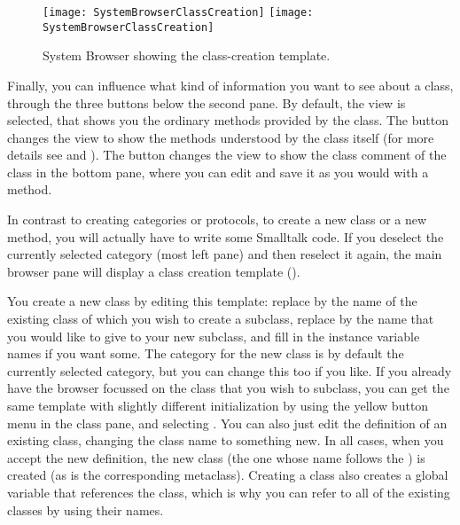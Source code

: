 \documentclass[a4paper,10pt,twoside]{book}
\begin{document}
\begin{figure}[htbp]
   \centering
   \ifluluelse
	   {\texttt{[image: SystemBrowserClassCreation]}}
	   {\texttt{[image: SystemBrowserClassCreation]}}
   \caption{System Browser showing the class-creation template.
   \label{fig:SystemBrowserClassCreation}}
\end{figure}

Finally, you can influence what kind of information you want to see about a class, through the three buttons below the second pane.
By default, the  view is selected, that shows you the ordinary methods provided by the class.
The  button changes the view to show the methods understood by the class itself (for more details see  and ).
The  button changes the view to show the class comment of the class in the bottom pane, where you can edit and save it as you would with a method.

In contrast to creating categories or protocols, to create a new class or a new method, you will actually have to write some Smalltalk code.
If you deselect the currently selected category (most left pane) and then reselect it again, the main browser pane will display a class creation template ().

You create a new class by editing this template: replace  by the name of the existing class of which you wish to create a subclass, replace  by the name that you would like to give to your new subclass, and fill in the instance variable names if you want some.
The category for the new class is by default the currently selected category, but you can change this too if you like.
If you already have the browser focussed on the class that you wish to subclass, you can get the same template with slightly different
initialization by using the yellow button menu in the class pane, and selecting .
You can also just edit the definition of an existing class, changing the class name to something new.
In all cases, when you accept the new definition, the new class (the one whose name follows the \ct{#}) is created (as is
the corresponding metaclass).
Creating a class also creates a global variable that references the class, which is why you can refer to all of the existing classes by using their names.
\end{document}
